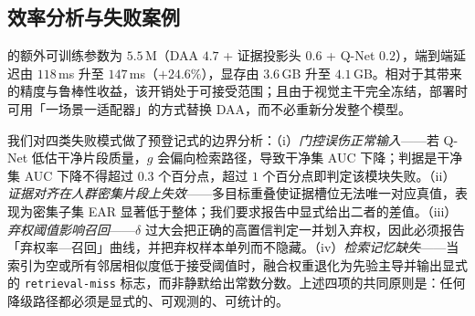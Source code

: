 \subsection{效率分析与失败案例}

\evivad{} 的额外可训练参数为 $5.5$\,M（DAA $4.7$ + 证据投影头 $0.6$ + Q-Net $0.2$），端到端延迟由 $118$\,ms 升至 $147$\,ms（$+24.6\%$），显存由 $3.6$\,GB 升至 $4.1$\,GB。相对于其带来的精度与鲁棒性收益，该开销处于可接受范围；且由于视觉主干完全冻结，部署时可用「一场景一适配器」的方式替换 DAA，而不必重新分发整个模型。

我们对四类失败模式做了预登记式的边界分析：（i）\emph{门控误伤正常输入}——若 Q-Net 低估干净片段质量，$g$ 会偏向检索路径，导致干净集 AUC 下降；判据是干净集 AUC 下降不得超过 $0.3$ 个百分点，超过 $1$ 个百分点即判定该模块失败。（ii）\emph{证据对齐在人群密集片段上失效}——多目标重叠使证据槽位无法唯一对应真值，表现为密集子集 EAR 显著低于整体；我们要求报告中显式给出二者的差值。（iii）\emph{弃权阈值影响召回}——$\delta$ 过大会把正确的高置信判定一并划入弃权，因此必须报告「弃权率—召回」曲线，并把弃权样本单列而不隐藏。（iv）\emph{检索记忆缺失}——当索引为空或所有邻居相似度低于接受阈值时，融合权重退化为先验主导并输出显式的 \texttt{retrieval-miss} 标志，而非静默给出常数分数。上述四项的共同原则是：任何降级路径都必须是显式的、可观测的、可统计的。
